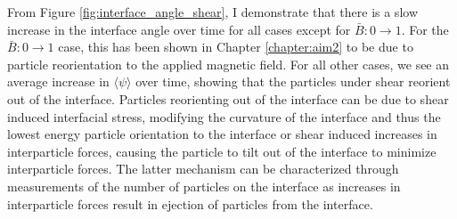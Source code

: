 From Figure \ref{fig:interface_angle_shear}, I demonstrate that there is a slow increase in the interface angle over time for all cases
except for $\bar{B}: 0 \to 1$. For the $\bar{B}: 0 \to 1$ case, this has been shown in Chapter \ref{chapter:aim2} to be due to particle
reorientation to the applied magnetic field. For all other cases, we see an average increase in $\langle \psi \rangle$ over time, showing
that the particles under shear reorient out of the interface. Particles reorienting out of the interface can be due to shear induced interfacial 
stress, modifying the curvature of the interface and thus the lowest energy particle orientation to the interface or shear induced increases in
interparticle forces, causing the particle to tilt out of the interface to minimize interparticle forces. The latter 
mechanism can be characterized through measurements of the number of particles on the interface as increases in interparticle forces result in ejection of
particles from the interface. 




